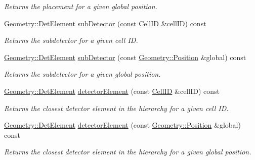 \begin{DoxyCompactItemize}
\begin{DoxyCompactList}\small\item\em Returns the placement for a given global position. \item\end{DoxyCompactList}\item 
\hyperlink{class_d_d4hep_1_1_geometry_1_1_det_element}{Geometry::DetElement} \hyperlink{class_d_d4hep_1_1_d_d_rec_1_1_i_d_decoder_ab2f95282ac90f29e3ac70d6fc7d467be}{subDetector} (const \hyperlink{namespace_d_d4hep_1_1_d_d_rec_af5cecc2e566eeaedb430b92df23971d4}{CellID} \&cellID) const 
\begin{DoxyCompactList}\small\item\em Returns the subdetector for a given cell ID. \item\end{DoxyCompactList}\item 
\hyperlink{class_d_d4hep_1_1_geometry_1_1_det_element}{Geometry::DetElement} \hyperlink{class_d_d4hep_1_1_d_d_rec_1_1_i_d_decoder_a1466e9c412d282849869517a4ac1de3f}{subDetector} (const \hyperlink{namespace_d_d4hep_1_1_geometry_a55083902099d03506c6db01b80404900}{Geometry::Position} \&global) const 
\begin{DoxyCompactList}\small\item\em Returns the subdetector for a given global position. \item\end{DoxyCompactList}\item 
\hyperlink{class_d_d4hep_1_1_geometry_1_1_det_element}{Geometry::DetElement} \hyperlink{class_d_d4hep_1_1_d_d_rec_1_1_i_d_decoder_aff2e1cdc9747a3d0de2df26f8f3f9704}{detectorElement} (const \hyperlink{namespace_d_d4hep_1_1_d_d_rec_af5cecc2e566eeaedb430b92df23971d4}{CellID} \&cellID) const 
\begin{DoxyCompactList}\small\item\em Returns the closest detector element in the hierarchy for a given cell ID. \item\end{DoxyCompactList}\item 
\hyperlink{class_d_d4hep_1_1_geometry_1_1_det_element}{Geometry::DetElement} \hyperlink{class_d_d4hep_1_1_d_d_rec_1_1_i_d_decoder_afb1d47dbcaca600ccbc8e9269eec0563}{detectorElement} (const \hyperlink{namespace_d_d4hep_1_1_geometry_a55083902099d03506c6db01b80404900}{Geometry::Position} \&global) const 
\begin{DoxyCompactList}\small\item\em Returns the closest detector element in the hierarchy for a given global position. \item\end{DoxyCompactList}\item 

\end{DoxyCompactItemize}
